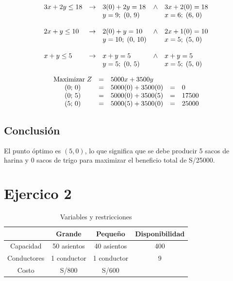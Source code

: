 \documentclass[12pt]{article}
\begin{document}
\[
\begin{array}{l l l l l l l}
3x + 2y \leq 18 & \rightarrow & 3(0) + 2y = 18     & \wedge & 3x + 2(0) = 18   \\
                &             & y = 9;\; (0,\,9)   &        & x = 6;\; (6,\,0) \\
                &             &                    &        &                  \\
2x + y \leq 10  & \rightarrow & 2(0) + y = 10      & \wedge & 2x + 1(0) = 10   \\
                &             & y = 10;\; (0,\,10) &        & x = 5;\; (5,\,0) \\
                &             &                    &        &                  \\
x + y \leq 5    & \rightarrow & x + y = 5          & \wedge & x + y = 5        \\
                &             & y = 5;\; (0,\,5)   &        & x = 5;\; (5,\,0) \\
\end{array}
\]

\vspace{0.5cm}

\[
\begin{array}{c c l c l}
\text{Maximizar}\;Z & = & 5000x + 3500y     &   &       \\
(0;\, 0)            & = & 5000(0) + 3500(0) & = & 0     \\
(0;\, 5)            & = & 5000(0) + 3500(5) & = & 17500 \\
(5;\, 0)            & = & 5000(5) + 3500(0) & = & 25000 \\
\end{array}
\]


\subsection*{Conclusión}
El punto óptimo es $(5, 0)$, lo que significa que se debe producir 5 sacos de harina y 0 sacos de trigo para maximizar el beneficio total de S/25000.





\newpage
\section*{Ejercico 2}
\begin{table}[h]
    \centering
    \begin{tabular}{|c|c|c|c|}
    \hline
                & Grande        & Pequeño     & Disponibilidad \\ \hline
    Capacidad   & 50 asientos   & 40 asientos & 400            \\ \hline
    Conductores & 1 conductor   & 1 conductor & 9              \\ \hline
    Costo       & S/800         & S/600       &                \\ \hline
    \end{tabular}
    \caption{Variables y restricciones}
    \label{tab:Ejercicio2}
\end{table}
\end{document}
